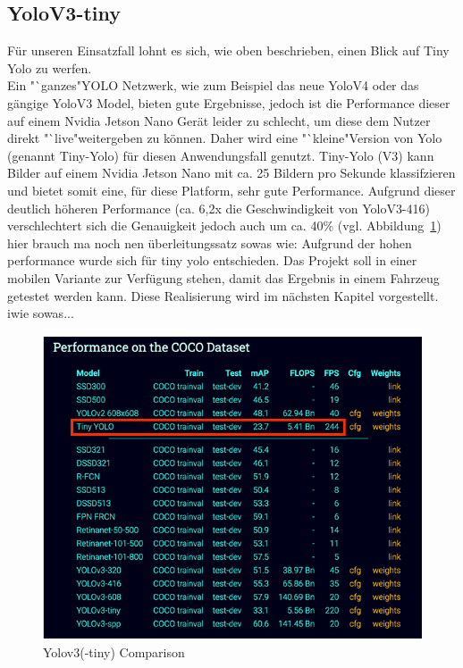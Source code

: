 \documentclass[a4paper,oneside,12pt]{report}
\begin{document}
\begin{onehalfspace}
		\subsection{YoloV3-tiny}
		Für unseren Einsatzfall lohnt es sich, wie oben beschrieben, einen Blick auf Tiny Yolo zu werfen. \\
		Ein "`ganzes"\space YOLO Netzwerk, wie zum Beispiel das neue YoloV4 oder das gängige YoloV3 Model, bieten gute Ergebnisse, jedoch ist die Performance dieser auf einem Nvidia Jetson Nano Gerät leider zu schlecht, um diese dem Nutzer direkt "`live"\space weitergeben zu können.
		Daher wird eine "`kleine"\space Version von Yolo (genannt Tiny-Yolo) für diesen Anwendungsfall genutzt. Tiny-Yolo (V3) kann Bilder auf einem Nvidia Jetson Nano mit ca. 25 Bildern pro Sekunde klassifzieren und bietet somit eine, für diese Platform, sehr gute Performance.\clearpage
		Aufgrund dieser deutlich höheren Performance (ca. 6,2x die Geschwindigkeit von YoloV3-416) verschlechtert sich die Genauigkeit jedoch auch um ca. 40\% (vgl. Abbildung~\ref{fig:yolov3-tiny}) hier brauch ma noch nen überleitungssatz sowas wie: Aufgrund der hohen performance wurde sich für tiny yolo entschieden. Das Projekt soll in einer mobilen Variante zur Verfügung stehen, damit das Ergebnis in einem Fahrzeug getestet werden kann. Diese Realisierung wird im nächsten Kapitel vorgestellt. iwie sowas...\\
		\begin{figure}[h!]
			\includegraphics[scale=0.7]{YoloV3-tiny.png}
			\caption{Yolov3(-tiny) Comparison}
			\label{fig:yolov3-tiny}
		\end{figure}
	\end{onehalfspace}
\end{document}
